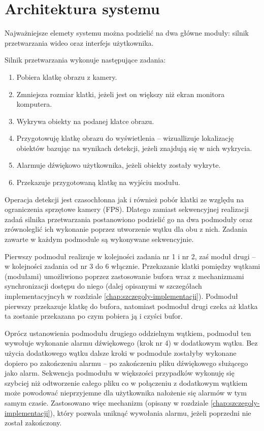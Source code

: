 \section{Architektura systemu}
\label{chap:architektura}
Najważniejsze elemety systemu można podzielić na dwa główne moduły: silnik przetwarzania wideo oraz interfejs użytkownika. 

Silnik przetwarzania wykonuje następujące zadania:
\begin{enumerate}
    \item Pobiera klatkę obrazu z kamery.
    \item Zmniejsza rozmiar klatki, jeżeli jest on większy niż ekran monitora komputera.
    \item Wykrywa obiekty na podanej klatce obrazu.
    \item Przygotowuję klatkę obrazu do wyświetlenia -- wizuallizuje lokalizację obiektów bazując na wynikach detekcji, jeżeli znajdują się w nich wykrycia.
    \item Alarmuje dźwiękowo użytkownika, jeżeli obiekty zostały wykryte.
    \item Przekazuje przygotowaną klatkę na wyjściu modułu. 
\end{enumerate}

Operacja detekcji jest czasochłonna jak i również pobór klatki ze względu na ograniczenia sprzętowe kamery (FPS). Dlatego zamiast sekwencyjnej realizacji zadań silnika przetwarzania postanowiono podzielić go na dwa podmoduły oraz zrównoleglić ich wykonanie poprzez utworzenie wątku dla obu z nich. Zadania zawarte w każdym podmodule są wykonywane sekwencyjnie.

Pierwszy podmoduł realizuje w kolejności zadania nr 1 i nr 2, zaś moduł drugi -- w kolejności zadania od nr 3 do 6 włącznie. Przekazanie klatki pomiędzy wątkami (modułami) umożliwiono poprzez zastosowanie bufora wraz z mechanizmami synchronizacji dostępu do niego (dalej opisanymi w szczegółach implementacyjncyh w rozdziale \ref{chap:szczegoly-implementacji}). Podmoduł pierwszy przekazuje klatkę do bufora, natomiast podmoduł drugi czeka aż klatka ta zostanie przekazana po czym pobiera ją i czyści bufor. 

Oprócz ustanowienia podmodułu drugiego oddzielnym wątkiem, podmoduł ten wywołuje wykonanie alarmu dźwiękowego (krok nr 4) w dodatkowym wątku. Bez użycia dodatkowego wątku dalsze kroki w podmodule zostałyby wykonane dopiero po zakończeniu alarmu -- po zakończeniu pliku dźwiękowego służącego jako alarm. Sekwencja podmodułu w większości przypadków wykonuję się szybciej niż odtworzenie całego pliku co w połączeniu z dodatkowym wątkiem może powodować nieprzyjemne dla użytkownika nałożenie się alarmów w tym samym czasie. Zastosowano więc mechanizm (opisany w rozdziale \ref{chap:szczegoly-implementacji}), który pozwala uniknąć wywołania alarmu, jeżeli poprzedni nie został zakończony.

